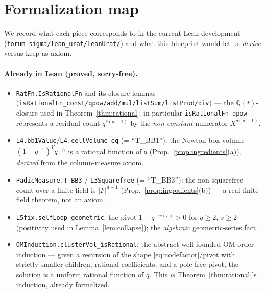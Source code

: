 \documentclass[11pt]{article}
\theoremstyle{definition}
\theoremstyle{remark}
\begin{document}
\section{Formalization map}\label{sec:formalization}

We record what each piece corresponds to in the current Lean development
(\texttt{forum-sigma/lean\_urat/LeanUrat/}) and what this blueprint would let us
\emph{derive} versus keep as axiom.

\paragraph{Already in Lean (proved, sorry-free).}
\begin{itemize}[nosep]
\item \texttt{RatFn.IsRationalFn} and its closure lemmas
(\texttt{isRationalFn\_const/qpow/add/mul/listSum/listProd/div}) --- the
$\mathbb Q(t)$-closure used in Theorem~\ref{thm:rational}; in particular
\texttt{isRationalFn\_qpow} represents a residual count $q^{\delta(d-1)}$ by the
\emph{non-constant} numerator $X^{\delta(d-1)}$.
\item \texttt{L4.bb1Value}/\texttt{L4.cellVolume\_eq} (= ``T\_BB1''): the
Newton-box volume $(1-q^{-1})^Vq^{-A}$ is a rational function of $q$
(Prop.~\ref{prop:ingredients}(a)), \emph{derived} from the column-measure axiom.
\item \texttt{PadicMeasure.T\_BB3} / \texttt{L3Squarefree} (= ``T\_BB3''): the
non-squarefree count over a finite field is $|F|^{d-1}$
(Prop.~\ref{prop:ingredients}(b)) --- a real finite-field theorem, not an axiom.
\item \texttt{L5fix.selfLoop\_geometric}: the pivot $1-q^{-w(s)}>0$ for $q\ge2$,
$s\ge2$ (positivity used in Lemma~\ref{lem:collapse}); the \emph{algebraic}
geometric-series fact.
\item \texttt{OMInduction.clusterVol\_isRational}: the abstract well-founded
OM-order induction --- given a recursion of the shape \eqref{eq:nodefactor}$/$pivot
with strictly-smaller children, rational coefficients, and a pole-free pivot, the
solution is a uniform rational function of $q$. This \emph{is}
Theorem~\ref{thm:rational}'s induction, already formalized.
\end{itemize}
\end{document}
